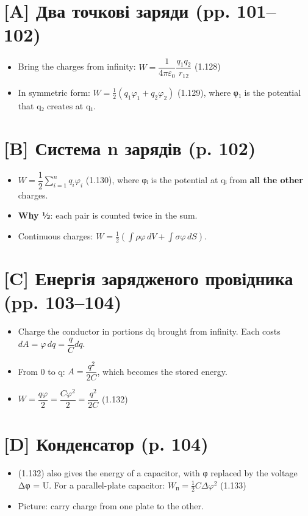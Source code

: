 \documentclass[11pt,a4paper,oneside]{book}
\begin{document}
\section*{[A] Два точкові заряди (pp. 101–102)}
\begin{itemize}
\item Bring the charges from infinity: $W = \dfrac{1}{4\pi\varepsilon_0}\dfrac{q_1q_2}{r_{12}}$ (1.128)
\item In symmetric form: $W = \tfrac12(q_1\varphi_1 + q_2\varphi_2)$ (1.129), where φ₁ is the potential that q₂ creates at q₁.
\end{itemize}

\section*{[B] Система n зарядів (p. 102)}
\begin{itemize}
\item $W = \dfrac12\sum_{i=1}^n q_i\varphi_i$ (1.130), where φᵢ is the potential at qᵢ from \textbf{all the other} charges.
\item \textbf{Why ½}: each pair is counted twice in the sum.
\item Continuous charges: $W = \tfrac12\left(\int\rho\varphi\,dV + \int\sigma\varphi\,dS\right)$.
\end{itemize}

\section*{[C] Енергія зарядженого провідника (pp. 103–104)}
\begin{itemize}
\item Charge the conductor in portions dq brought from infinity. Each costs $dA = \varphi\,dq = \dfrac{q}{C}dq$.
\item From 0 to q: $A = \dfrac{q^2}{2C}$, which becomes the stored energy.
\item $W = \dfrac{q\varphi}{2} = \dfrac{C\varphi^2}{2} = \dfrac{q^2}{2C}$ (1.132)
\end{itemize}

\section*{[D] Конденсатор (p. 104)}
\begin{itemize}
\item (1.132) also gives the energy of a capacitor, with φ replaced by the voltage Δφ = U. For a parallel-plate capacitor: $W_\text{п} = \tfrac12C\Delta\varphi^2$ (1.133)
\item Picture: carry charge from one plate to the other.
\end{itemize}
\end{document}
